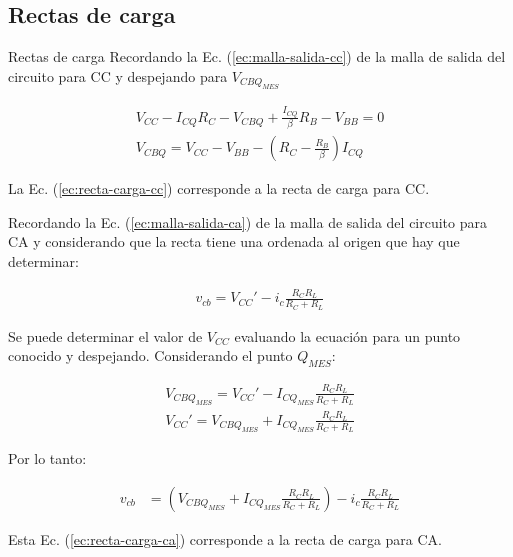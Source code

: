 \subsection{Rectas de carga}
\begin{frame}{Rectas de carga}
    Recordando la Ec. (\ref{ec:malla-salida-cc}) de la malla de salida del circuito para CC
    y despejando para $V_{CBQ_{MES}}$

\begin{gather}
    V_{CC} - I_{CQ}R_C - V_{CBQ} + \frac{I_{CQ}}{\beta}R_B - V_{BB} = 0 \nonumber \\[6pt]
    V_{CBQ} = V_{CC} - V_{BB} - \left(R_C - \frac{R_B}{\beta}\right)I_{CQ} \label{ec:recta-carga-cc}
\end{gather}

La Ec. (\ref{ec:recta-carga-cc}) corresponde a la recta de carga para CC.

Recordando la Ec. (\ref{ec:malla-salida-ca}) de la malla de salida del circuito para CA y
considerando que la recta tiene una ordenada al origen que hay que determinar:

\begin{gather}
v_{cb} = V_{CC}'-i_c\frac{R_C R_L}{R_C + R_L} \nonumber
\end{gather}

Se puede determinar el valor de $V_{CC}$ evaluando la ecuación para un punto conocido y
despejando. Considerando el punto $Q_{MES}$:

\begin{align*}
V_{CBQ_{MES}} = V_{CC}'-I_{CQ_{MES}}\frac{R_C R_L}{R_C + R_L} \\[6pt]
V_{CC}' = V_{CBQ_{MES}} + I_{CQ_{MES}}\frac{R_C R_L}{R_C + R_L}
\end{align*}

Por lo tanto:

\begin{align}
    v_{cb} &= \left(V_{CBQ_{MES}} + I_{CQ_{MES}}\frac{R_C R_L}{R_C + R_L}\right)-i_c\frac{R_C R_L}{R_C + R_L} \label{ec:recta-carga-ca}
\end{align}

Esta Ec. (\ref{ec:recta-carga-ca}) corresponde a la recta de carga para CA.


\end{frame}
